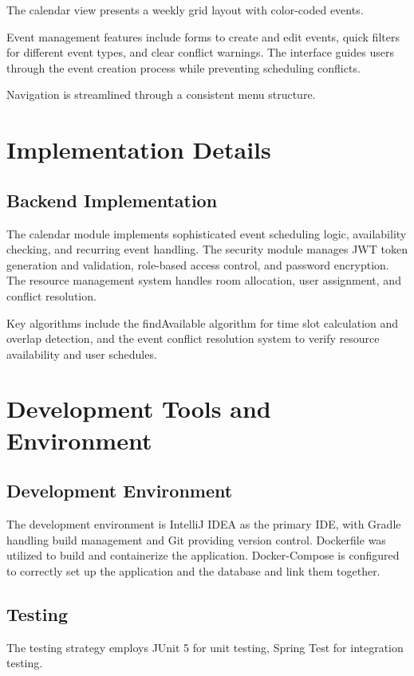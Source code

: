 The calendar view presents a weekly grid layout with color-coded events.

Event management features include forms to create and edit events, quick filters for different event types, and clear conflict warnings.
The interface guides users through the event creation process while preventing scheduling conflicts.

Navigation is streamlined through a consistent menu structure.

\section{Implementation Details}\label{sec:implementation-details}

\subsection{Backend Implementation}\label{subsec:backend-implementation}

The calendar module implements sophisticated event scheduling logic, availability checking, and recurring event handling.
The security module manages JWT token generation and validation, role-based access control, and password encryption.
The resource management system handles room allocation, user assignment, and conflict resolution.

Key algorithms include the findAvailable algorithm for time slot calculation and overlap detection, and the event conflict resolution system to verify resource availability and user schedules.


\section{Development Tools and Environment}\label{sec:development-tools}

\subsection{Development Environment}\label{subsec:development-environment}
The development environment is IntelliJ IDEA as the primary IDE, with Gradle handling build management and Git providing version control.
Dockerfile was utilized to build and containerize the application.
Docker-Compose is configured to correctly set up the application and the database and link them together.

\subsection{Testing}\label{subsec:testing-framework}
The testing strategy employs JUnit 5 for unit testing, Spring Test for integration testing.